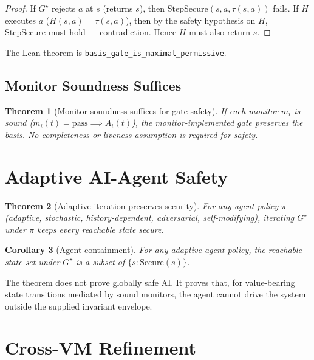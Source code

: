 \documentclass[11pt,a4paper]{article}
\newtheorem{theorem}{Theorem}
\newtheorem{corollary}[theorem]{Corollary}
\begin{document}
\begin{proof}[Proof]
If $G^\star$ rejects $a$ at $s$ (returns $s$), then $\mathrm{StepSecure}(s, a, \tau(s,a))$ fails. If $H$ executes $a$ ($H(s,a) = \tau(s,a)$), then by the safety hypothesis on $H$, $\mathrm{StepSecure}$ must hold — contradiction. Hence $H$ must also return $s$.
\end{proof}

The Lean theorem is \texttt{basis\_gate\_is\_maximal\_permissive}.

\subsection{Monitor Soundness Suffices}

\begin{theorem}[Monitor soundness suffices for gate safety]\label{thm:monitor-sound}
If each monitor $m_i$ is sound ($m_i(t) = \mathrm{pass} \implies A_i(t)$), the monitor-implemented gate preserves the basis. No completeness or liveness assumption is required for safety.
\end{theorem}

\section{Adaptive AI-Agent Safety}\label{sec:ai-agent}

\begin{theorem}[Adaptive iteration preserves security]\label{thm:adaptive}
For any agent policy $\pi$ (adaptive, stochastic, history-dependent, adversarial, self-modifying), iterating $G^\star$ under $\pi$ keeps every reachable state secure.
\end{theorem}

\begin{corollary}[Agent containment]
For any adaptive agent policy, the reachable state set under $G^\star$ is a subset of $\{s : \mathrm{Secure}(s)\}$.
\end{corollary}

The theorem does not prove globally safe AI. It proves that, for value-bearing state transitions mediated by sound monitors, the agent cannot drive the system outside the supplied invariant envelope.

\section{Cross-VM Refinement}\label{sec:refinement}
\end{document}
